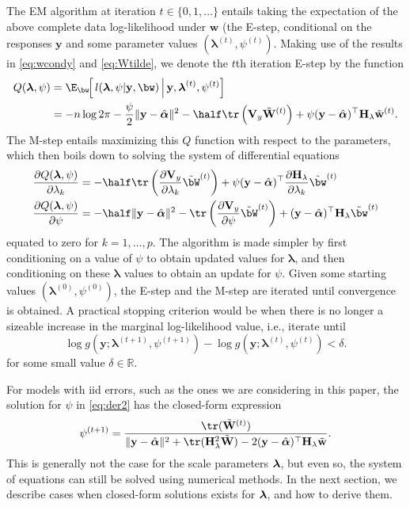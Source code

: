 \documentclass[english, 11pt]{article}
\begin{document}
The EM algorithm at iteration $t \in \{0, 1, \dots\}$ entails taking the expectation of the above complete data log-likelihood under $\mathbf w$ (the E-step, conditional on the responses $\mathbf y$ and some parameter values $(\boldsymbol{\lambda}^{(t)}, \psi^{(t)})$. Making use of the results in \eqref{eq:wcondy} and \eqref{eq:Wtilde}, we denote the $t$th iteration E-step by the function
\begin{align*}
  Q(\blam, \psi)
  &= \E_{\bw}\!\Big[\, l(\blam, \psi | \mathbf y, \bw) \, \Big| \, \mathbf y, \blam^{(t)}, \psi^{(t)} \Big]  \\
  &= - n \log 2\pi - \frac{\psi}{2} \Vert \mathbf y - \hat{\boldsymbol\alpha} \Vert^2 - \half \tr \left( \mathbf V_y \Wtilde^{(t)} \right) + \psi(\mathbf y - \hat{\boldsymbol\alpha})^\top \mathbf H_\lambda \wtilde^{(t)}.
\end{align*}
The M-step entails maximizing this $Q$ function with respect to the parameters, which then boils down to solving the system of differential equations
\begin{align}
	\frac{\partial Q(\blam, \psi)}{\partial \lambda_k}
	&= - \half \tr \left( \frac{\partial \mathbf V_y}{\partial \lambda_k} \tilde{\bW}^{(t)} \right) + \psi(\mathbf y - \hat{\boldsymbol\alpha})^\top \frac{\partial\mathbf H_\lambda}{\partial \lambda_k} \tilde{\bw}^{(t)} \label{eq:der1} \\
	\frac{\partial Q(\blam, \psi)}{\partial \psi}
	&= - \half \Vert \mathbf y - \hat{\boldsymbol\alpha} \Vert^2 - \tr \left( \frac{\partial \mathbf V_y}{\partial \psi} \tilde{\bW}^{(t)} \right) + (\mathbf y - \hat{\boldsymbol\alpha})^\top \mathbf H_\lambda \tilde{\bw}^{(t)} \label{eq:der2}
\end{align}
equated to zero for $k = 1, \dots, p$. The algorithm is made simpler by first conditioning on a value of $\psi$ to obtain updated values for $\boldsymbol\lambda$, and then conditioning on these $\boldsymbol\lambda$ values to obtain an update for $\psi$. Given some starting values $(\boldsymbol{\lambda}^{(0)}, \psi^{(0)})$, the E-step and the M-step are iterated until convergence is obtained. A practical stopping criterion would be when there is no longer a sizeable increase in the marginal log-likelihood value, i.e., iterate until
\[
	\log g(\mathbf y; \boldsymbol{\lambda}^{(t+1)}, \psi^{(t+1)}) - \log g(\mathbf y; \boldsymbol{\lambda}^{(t)}, \psi^{(t)}) < \delta.
\]
for some small value $\delta \in \mathbb R$.

For models with iid errors, such as the ones we are considering in this paper, the solution for $\psi$ in \eqref{eq:der2} has the closed-form expression 
\[
	\psi^{(t+1)} = \frac{\tr ( \Wtilde^{(t)} )}{\Vert \mathbf y - \hat{\boldsymbol\alpha} \Vert^2 + \tr(\Hlam^2 \Wtilde) - 2(\mathbf y - \hat{\boldsymbol\alpha})^\top\mathbf \Hlam \wtilde} .
\]
This is generally not the case for the scale parameters $\boldsymbol\lambda$, but even so, the system of equations can still be solved using numerical methods. In the next section, we describe cases when closed-form solutions exists for $\boldsymbol\lambda$, and how to derive them.
\end{document}
